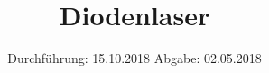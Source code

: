 

\subject{VERSUCH NUMMER 60}
\title{Diodenlaser}
\date{
  Durchführung: 15.10.2018
  \hspace{3em}
  Abgabe: 02.05.2018
}



\thispagestyle{empty}
\maketitle
\thispagestyle{empty}
\tableofcontents
\newpage
\setcounter{page}{1}


% 

% 


\nocite{*}
\printbibliography


